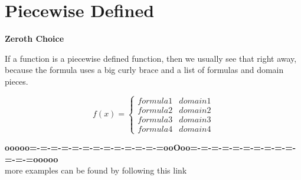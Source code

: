 \documentclass{ximera}
\begin{document}
\section{Piecewise Defined}


\textbf{\textcolor{purple!85!blue}{Zeroth Choice}} 

If a function is a piecewise defined function, then we usually see that right away, because the formula uses a big curly brace and a list of formulas and domain pieces.




\[
f(x) = 
\begin{cases}
  formula 1 & domain 1  \\
  formula 2 & domain 2  \\
  formula 3 & domain 3  \\
  formula 4 & domain 4  
\end{cases}
\]









\begin{center}
\textbf{\textcolor{green!50!black}{ooooo=-=-=-=-=-=-=-=-=-=-=-=-=ooOoo=-=-=-=-=-=-=-=-=-=-=-=-=ooooo}} \\

more examples can be found by following this link\\ 

\end{center}
\end{document}

